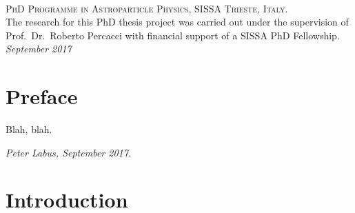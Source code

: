 \documentclass[11pt]{book} %
\makeatletter
\def\cleardoublepage{\clearpage%
  \if@twoside
  \ifodd\c@page\else
  \vspace*{\fill}
  \hfill
  \begin{center}
    This page intentionally left blank.
  \end{center}
  \vspace{\fill}
  \thispagestyle{empty}
  \newpage
  \if@twocolumn\hbox{}\newpage\fi
  \fi
  \fi
}
\makeatother
\begin{document}



\newpage
~\vfill
\thispagestyle{empty}

\noindent \textsc{PhD Programme in Astroparticle Physics, SISSA Trieste, Italy.}\\

\noindent The research for this PhD thesis project was carried out
under the supervision of Prof.~Dr.~Roberto Percacci with financial support
of a SISSA PhD Fellowship.\\

\noindent \textit{September 2017} %


\chapter*{Preface}

Blah, blah.

\begin{flushright}
  \textit{Peter Labus, September 2017.}
\end{flushright}


\pagestyle{empty} %

\tableofcontents %


\pagestyle{fancy} %


\chapter*{Introduction}
\end{document}
